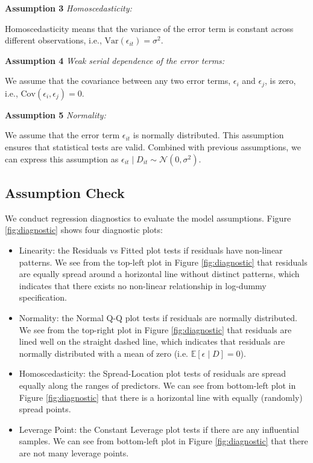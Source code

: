 \documentclass[a4paper, 11pt]{article}
\begin{document}
\textbf{Assumption 3 } \textit{Homoscedasticity:}

Homoscedasticity means that the variance of the error term is constant across different observations, i.e., $\mathrm{Var}(\epsilon_{it})=\sigma^2$.

\textbf{Assumption 4 } \textit{Weak serial dependence of the error terms:}

We assume that the covariance between any two error terms, $\epsilon_{i}$ and $\epsilon_{j}$, is zero, i.e., $\mathrm{Cov}(\epsilon_i,\epsilon_j)=0$.

\textbf{Assumption 5 } \textit{Normality:}

We assume that the error term $\epsilon_{it}$ is normally distributed. This assumption ensures that statistical tests are valid. Combined with previous assumptions, we can express this assumption as $\epsilon_{it}\mid D_{it}\sim\mathcal{N}(0, \sigma^2)$.


\subsection{Assumption Check}

We conduct regression diagnostics to evaluate the model assumptions. Figure \ref{fig:diagnostic} shows four diagnostic plots:

\begin{itemize}
    \item Linearity: the Residuals vs Fitted plot tests if residuals have non-linear patterns. We see from the top-left plot in Figure \ref{fig:diagnostic} that residuals are equally spread around a horizontal line without distinct patterns, which indicates that there exists no non-linear relationship in log-dummy specification.
    \item Normality: the Normal Q-Q plot tests if residuals are normally distributed. We see from the top-right plot in Figure \ref{fig:diagnostic} that residuals are lined well on the straight dashed line, which indicates that residuals are normally distributed with a mean of zero (i.e. $\mathbb{E}[\epsilon\mid D]=0$).
    \item Homoscedasticity: the Spread-Location plot tests of residuals are spread equally along the ranges of predictors. We can see from bottom-left plot in Figure \ref{fig:diagnostic} that there is a horizontal line with equally (randomly) spread points.
    \item Leverage Point: the Constant Leverage plot tests if there are any influential samples. We can see from bottom-left plot in Figure \ref{fig:diagnostic} that there are not many leverage points.
\end{itemize}
\end{document}
